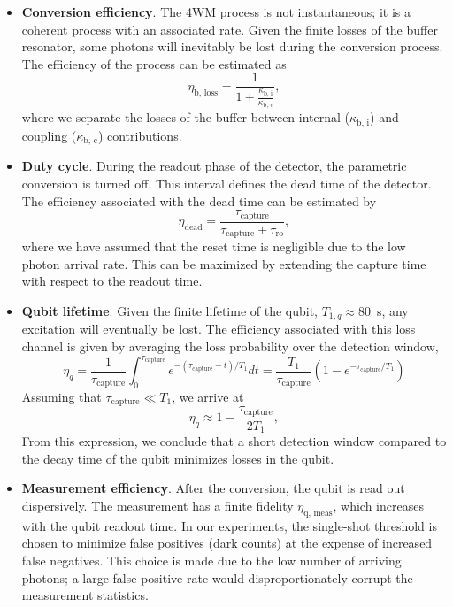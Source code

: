 \begin{itemize}
    \item \textbf{Conversion efficiency}. The 4WM process is not instantaneous; it is a coherent process with an associated rate. Given the finite losses of the buffer resonator, some photons will inevitably be lost during the conversion process. The efficiency of the process can be estimated as  \[\eta_\text{b, loss} = \frac{1}{1 + \tfrac{\kappa_\text{b, i}}{\kappa_\text{b, c}}},\] where we separate the losses of the buffer between internal ($\kappa_\text{b, i}$) and coupling ($\kappa_\text{b, c}$) contributions.
    
    \item \textbf{Duty cycle}. During the readout phase of the detector, the parametric conversion is turned off. This interval defines the dead time of the detector. The efficiency associated with the dead time can be estimated by \[\eta_\text{dead} = \frac{\tau_\text{capture}}{\tau_\text{capture} + \tau_\text{ro}},\] where we have assumed that the reset time is negligible due to the low photon arrival rate. This can be maximized by extending the capture time with respect to the readout time.
    
    \item \textbf{Qubit lifetime}. Given the finite lifetime of the qubit, $T_{1, q}\approx80$~\textmu s, any excitation will eventually be lost. The efficiency associated with this loss channel is given by averaging the loss probability over the detection window, \[\eta_{q} = \frac{1}{\tau_\text{capture}}\int_0^{\tau_\text{capture}} e^{-(\tau_\text{capture} - t)/T_1}dt = \frac{T_1}{\tau_\text{capture}} \left(1 -e^{-\tau_\text{capture}/T_1} \right) \] Assuming that $\tau_\text{capture}\ll T_1$, we arrive at \[\eta_{q}\approx 1 - \frac{\tau_\text{capture}}{2T_1},\] From this expression, we conclude that a short detection window compared to the decay time of the qubit minimizes losses in the qubit.
    
    \item \textbf{Measurement efficiency}. After the conversion, the qubit is read out dispersively. The measurement has a finite fidelity $\eta_\text{q, meas}$, which increases with the qubit readout time. In our experiments, the single-shot threshold is chosen to minimize false positives (dark counts) at the expense of increased false negatives. This choice is made due to the low number of arriving photons; a large false positive rate would disproportionately corrupt the measurement statistics.
  
\end{itemize}

